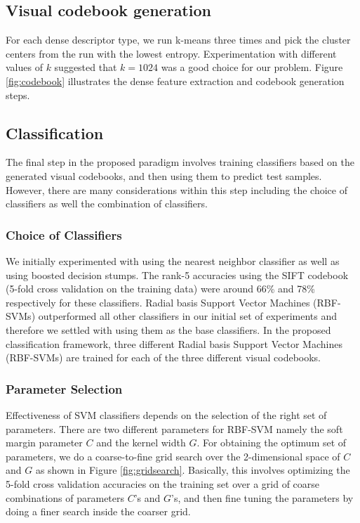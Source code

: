 \documentclass[12pt]{article}
\begin{document}
\subsection{Visual codebook generation}
For each dense descriptor type, we run k-means three times and pick the cluster centers from the run with the lowest entropy.
Experimentation with different values of $k$ suggested that $k=1024$ was a good choice for our problem.
Figure \ref{fig:codebook} illustrates the dense feature extraction and codebook generation steps. 

\subsection{Classification}
The final step in the proposed paradigm involves training classifiers based on the generated visual codebooks, and then using them to predict test samples. However, there are many considerations within this step including the choice of classifiers as well the combination of classifiers.

\subsubsection{Choice of Classifiers}
We initially experimented with using the nearest neighbor classifier as well as using boosted decision stumps. The rank-5 accuracies using the SIFT codebook (5-fold cross validation on the training data) were around 66\% and 78\% respectively for these classifiers. Radial basis Support Vector Machines (RBF-SVMs) outperformed all other classifiers in our initial set of experiments and therefore we settled with using them as the base classifiers. In the proposed classification framework, three different Radial basis Support Vector Machines (RBF-SVMs) are trained for each of the three different visual codebooks.

\subsubsection{Parameter Selection}
Effectiveness of SVM classifiers depends on the selection of the right set of parameters. There are two different parameters for RBF-SVM namely the soft margin parameter $C$ and the kernel width $G$. For obtaining the optimum set of parameters, we do a coarse-to-fine grid search over the 2-dimensional space of $C$ and $G$ as shown in Figure \ref{fig:gridsearch}. Basically, this involves optimizing the 5-fold cross validation accuracies on the training set over a grid of coarse combinations of parameters $C$'s and $G$'s, and then fine tuning the parameters by doing a finer search inside the coarser grid.
\end{document}
